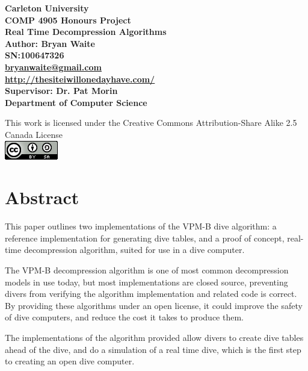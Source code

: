 \documentclass[12pt]{article}
\begin{document}
\begin{titlepage}
\begin{center}
\large{\textbf{Carleton University}\\
\textbf{COMP 4905 Honours Project}\\
\textbf{Real Time Decompression Algorithms}\\
\textbf{Author: Bryan Waite}\\
\textbf{SN:100647326}\\
\textbf{\color{blue}\uline{\href{mailto:bryanwaite@gmail.com}{bryanwaite@gmail.com}}}\\
\textbf{\color{blue}\uline{\href{http://thesiteiwillonedayhave.com/}{http://thesiteiwillonedayhave.com/}}}\\
\textbf{Supervisor: Dr. Pat Morin}\\
\textbf{Department of Computer Science}}\\
\date{\today}

\vfill
This work is licensed under the Creative Commons Attribution-Share Alike 2.5 Canada License \\
\includegraphics{cc_by_sa.png}
\end{center}
\end{titlepage}

\newpage

\section*{Abstract}
\small{This paper outlines two implementations of the VPM-B dive algorithm: a reference implementation for
  generating dive tables, and a proof of concept, real-time decompression algorithm, suited for
  use in a dive computer.

  The VPM-B decompression algorithm is one of most common decompression models in use today, but most
  implementations are closed source, preventing divers from verifying the algorithm implementation and related code
  is correct. By providing these algorithms under an open license, it could improve the safety of dive
  computers, and reduce the cost it takes to produce them.

  The implementations of the algorithm provided allow divers to create dive tables ahead of the dive, and
  do a simulation of a real time dive, which is the first step to creating an open dive computer.
}
\end{document}

